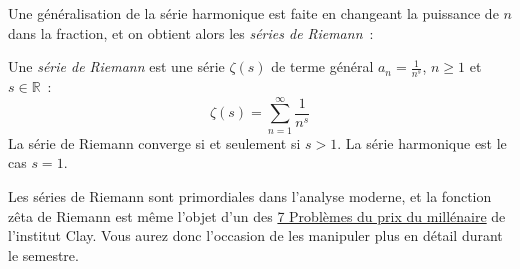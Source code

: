 Une généralisation de la série harmonique est faite en changeant la puissance de $n$ dans la fraction, et on obtient alors les \emph{séries de Riemann}~:
\begin{boxdef}
Une \emph{série de Riemann} est une série $\zeta(s)$ de terme général $a_n = \frac{1}{n^s}$, $n \geq 1$ et $s \in \mathbb{R}$~:
\begin{equation}
\zeta(s) = \sum_{n = 1}^{\infty} \frac{1}{n^s}
\end{equation}
La série de Riemann converge si et seulement si $s > 1$. La série harmonique est le cas $s = 1$.
\end{boxdef}
Les séries de Riemann sont primordiales dans l'analyse moderne, et la fonction zêta de Riemann est même l'objet d'un des \href{https://fr.wikipedia.org/wiki/Probl\%C3\%A8mes_du_prix_du_mill\%C3\%A9naire}{7 Problèmes du prix du millénaire} de l'institut Clay. Vous aurez donc l'occasion de les manipuler plus en détail durant le semestre.